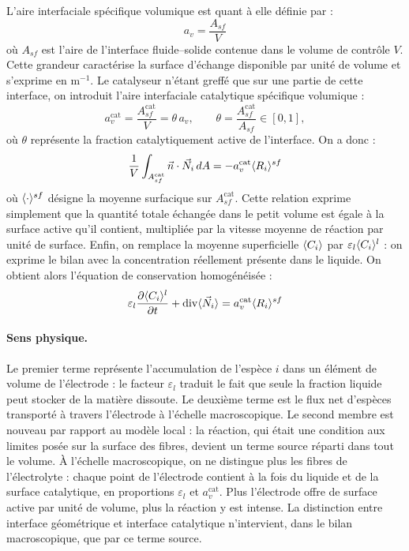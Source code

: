 L’aire interfaciale spécifique volumique est quant à elle définie par :
\begin{equation}
a_v = \frac{A_{sf}}{V}
\end{equation}
où $A_{sf}$ est l’aire de l’interface fluide–solide contenue dans le volume de contrôle $V$.
Cette grandeur caractérise la surface d’échange disponible par unité de volume et s’exprime en m$^{-1}$.
Le catalyseur n'étant greffé que sur une partie de cette interface, on
introduit l'aire interfaciale catalytique spécifique volumique :
\begin{equation}
a_v^{\mathrm{cat}} = \frac{A_{sf}^{\mathrm{cat}}}{V} = \theta\, a_v,
\qquad \theta = \frac{A_{sf}^{\mathrm{cat}}}{A_{sf}} \in [0,1],
\end{equation}
où $\theta$ représente la fraction catalytiquement active de l'interface.
On a donc :
\begin{equation}
\frac{1}{V}\int_{A_{sf}^{\mathrm{cat}}} \vec{n} \cdot \vec{N}_i\, dA = -a_v^{\mathrm{cat}} \langle R_i \rangle^{sf}
\end{equation}
où $\langle \cdot \rangle^{sf}$ désigne la moyenne surfacique sur $A_{sf}^{\mathrm{cat}}$.
Cette relation exprime simplement que la quantité totale échangée dans le
petit volume est égale à la surface active qu'il contient, multipliée par la
vitesse moyenne de réaction par unité de surface. Enfin, on remplace la
moyenne superficielle $\langle C_i \rangle$ par $\varepsilon_l\langle C_i \rangle^l$ : on exprime
le bilan avec la concentration réellement présente dans le liquide.
On obtient 
alors l'équation de conservation homogénéisée :
\begin{equation}
\varepsilon_l \frac{\partial \langle C_i \rangle^l}{\partial t} + \operatorname{div} \langle \vec{N}_i \rangle
= a_v^{\mathrm{cat}} \langle R_i \rangle^{sf}
\label{eq:cons_homo}
\end{equation}

\paragraph{Sens physique.} Le premier terme représente l'accumulation de
l'espèce $i$ dans un élément de volume de l'électrode : le facteur
$\varepsilon_l$ traduit le fait que seule la fraction liquide peut stocker de
la matière dissoute. Le deuxième terme est le flux net d'espèces transporté à
travers l'électrode à l'échelle macroscopique. Le second membre est nouveau par
rapport au modèle local : la réaction, qui était une condition aux limites
posée sur la surface des fibres, devient un terme source réparti dans tout le
volume. À l'échelle macroscopique, on ne distingue plus les fibres de
l'électrolyte : chaque point de l'électrode contient à la fois du liquide et
de la surface catalytique, en proportions $\varepsilon_l$ et
$a_v^{\mathrm{cat}}$. Plus l'électrode offre de surface active par unité de
volume, plus la réaction y est intense. La distinction entre interface
géométrique et interface catalytique n'intervient, dans le bilan
macroscopique, que par ce terme source.

